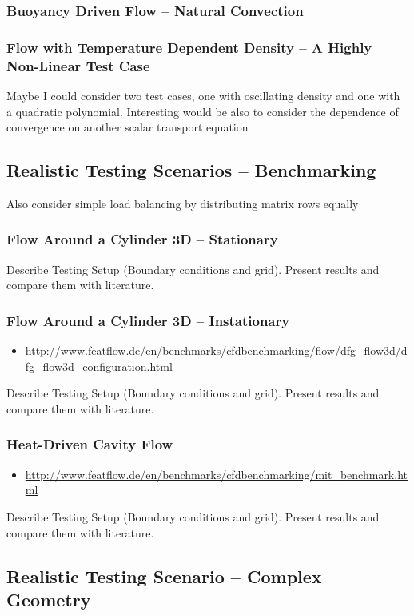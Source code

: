       \subsubsection{Buoyancy Driven Flow -- Natural Convection}
      \subsubsection{Flow with Temperature Dependent Density -- A Highly Non-Linear Test Case}
        Maybe I could consider two test cases, one with oscillating density and one with a quadratic polynomial. Interesting would be also to consider the dependence of convergence on another scalar transport equation

    \subsection{Realistic Testing Scenarios -- Benchmarking}
        Also consider simple load balancing by distributing matrix rows equally
      
      \subsubsection{Flow Around a Cylinder 3D -- Stationary}
        Describe Testing Setup (Boundary conditions and grid). Present results and compare them with literature.
      \subsubsection{Flow Around a Cylinder 3D -- Instationary}
        \begin{itemize}
          \item\url{http://www.featflow.de/en/benchmarks/cfdbenchmarking/flow/dfg_flow3d/dfg_flow3d_configuration.html}
        \end{itemize}
        Describe Testing Setup (Boundary conditions and grid). Present results and compare them with literature.

      \subsubsection{Heat-Driven Cavity Flow}
        \begin{itemize}
          \item \url{http://www.featflow.de/en/benchmarks/cfdbenchmarking/mit_benchmark.html}
        \end{itemize}
        Describe Testing Setup (Boundary conditions and grid). Present results and compare them with literature.
    \subsection{Realistic Testing Scenario -- Complex Geometry}
